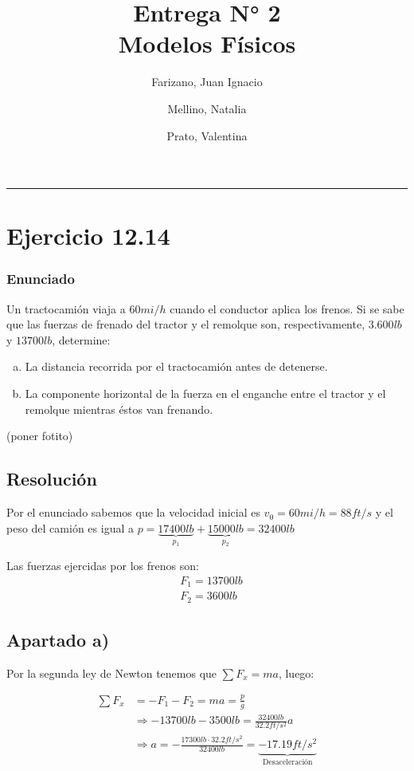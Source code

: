 \documentclass[11pt]{article}
\title{
  Entrega N° 2 \\
  \large Modelos Físicos
}
\author{
  Farizano, Juan Ignacio \\
  \and
  Mellino, Natalia \\
  \and
  Prato, Valentina
}
\date{}
\begin{document}
\maketitle
\noindent\rule{\textwidth}{1pt}

\section*{Ejercicio 12.14}

\subsubsection*{Enunciado}

Un tractocamión viaja a $60 mi/h$ cuando el conductor aplica los
frenos. Si se sabe que las fuerzas de frenado del tractor y el remolque son,
respectivamente, $3.600 lb$ y $13 700 lb$, determine:

\begin{enumerate}[a)]
  \item La distancia recorrida por el tractocamión antes de detenerse.
  \item La componente horizontal de la fuerza en el enganche entre el tractor
        y el remolque mientras éstos van frenando.
\end{enumerate}

(poner fotito)

\subsection*{Resolución}

Por el enunciado sabemos que la velocidad inicial es $v_0 = 60mi/h = 88 ft/s$
y el peso del camión es igual a
$p = \underbrace{17400lb}_{p_1} + \underbrace{15000lb}_{p_2} = 32400lb$

Las fuerzas ejercidas por los frenos son:
\begin{align*}
  & F_1 = 13700lb \\
  & F_2 = 3600lb
\end{align*}

\subsection*{Apartado a)}

Por la segunda ley de Newton tenemos que $\sum F_x = ma$, luego:

\begin{align*}
  \sum F_x &= -F_1 - F_2 = ma = \frac{p}{g} \\
           &\Rightarrow -13700lb - 3500lb = \frac{32400lb}{32.2 ft/s^2}a \\
           &\Rightarrow a = - \frac{17300lb \cdot 32.2ft/s^2}{32400lb} 
           = \underbrace{-17.19ft/s^2}_{\text{Desaceleración}}
\end{align*}
\end{document}
